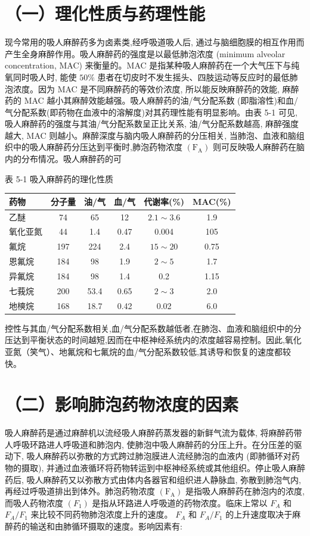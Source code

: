 \documentclass[10pt]{article}
\begin{document}
\section*{（一）理化性质与药理性能}
现今常用的吸人麻醉药多为卤素类,经呼吸道吸人后, 通过与脑细胞膜的相互作用而产生全身麻醉作用。吸人麻醉药的强度是以最低肺泡浓度 (minimum alveolar concentration, MAC) 来衡量的。MAC 是指某种吸人麻醉药在一个大气压下与纯氧同时吸人时, 能使 $50 \%$ 患者在切皮时不发生摇头、四肢运动等反应时的最低肺泡浓度。因为 MAC 是不同麻醉药的等效价浓度, 所以能反映麻醉药的效能, 麻醉药的 MAC 越小其麻醉效能越强。吸人麻醉药的油/气分配系数 (即脂溶性)和血/气分配系数(即药物在血液中的溶解度)对其药理性能有明显影响。由表 5-1 可见, 吸人麻醉药的强度与其油/气分配系数呈正比关系, 油/气分配系数越高, 麻醉强度越大, MAC 则越小。麻醉深度与脑内吸人麻醉药的分压相关, 当肺泡、血液和脑组织中的吸人麻醉药分压达到平衡时,肺泡药物浓度 $\left(\mathrm{F}_{\mathrm{A}}\right)$ 则可反映吸人麻醉药在脑内的分布情况。吸人麻醉药的可

表 5-1 吸入麻醉药的理化性质

\begin{center}
\begin{tabular}{lccccc}
\hline
药物 & 分子量 & 油/气 & 血/气 & 代谢率(\%) & MAC(\%) \\
\hline
乙醚 & 74 & 65 & 12 & $2.1 \sim 3.6$ & 1.9 \\
氧化亚氮 & 44 & 1.4 & 0.47 & 0.004 & 105 \\
氟烷 & 197 & 224 & 2.4 & $15 \sim 20$ & 0.75 \\
恩氟烷 & 184 & 98 & 1.9 & $2 \sim 5$ & 1.7 \\
异氟烷 & 184 & 98 & 1.4 & 0.2 & 1.15 \\
七莪烷 & 200 & 53.4 & 0.65 & $2 \sim 3$ & 2.0 \\
地樉烷 & 168 & 18.7 & 0.42 & 0.02 & 6.0 \\
\hline
\end{tabular}
\end{center}

控性与其血/气分配系数相关,血/气分配系数越低者,在肺泡、血液和脑组织中的分压达到平衡状态的时间越短,因而在中枢神经系统内的浓度越容易控制。因此,氧化亚氮（笑气）、地氟烷和七氟烷的血/气分配系数较低,其诱导和恢复的速度都较快。

\section*{（二）影响肺泡药物浓度的因素}
吸人麻醉药是通过麻醉机以流经吸人麻醉药蒸发器的新鲜气流为载体, 将麻醉药带人呼吸环路进人呼吸道和肺泡内, 使肺泡中吸人麻醉药的分压上升。在分压差的驱动下, 吸人麻醉药以弥散的方式跨过肺泡膜进人流经肺泡的血液内 (即肺循环对药物的摄取), 并通过血液循环将药物转运到中枢神经系统或其他组织。停止吸人麻醉药后, 吸人麻醉药又以弥散方式由体内各器官和组织进人静脉血, 弥散到肺泡气内, 再经过呼吸道排出到体外。肺泡药物浓度 $\left(\mathrm{F}_{\mathrm{A}}\right)$ 是指吸人麻醉药在肺泡内的浓度, 而吸人药物浓度 $\left(F_{1}\right)$ 是指从环路进人呼吸道的药物浓度。临床上常以 $F_{A}$ 和 $F_{A} / F_{1}$ 来比较不同药物肺泡浓度上升的速度。 $F_{A}$ 和 $F_{A} / F_{1}$ 的上升速度取决于麻醉药的输送和由肺循环摄取的速度。影响因素有:
\end{document}
